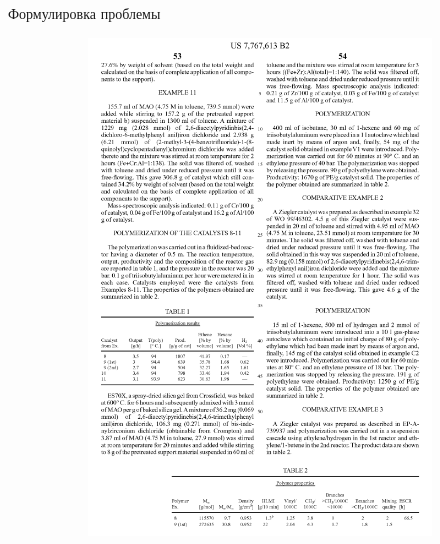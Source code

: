 \documentclass{beamer}
\begin{document}
	\begin{frame}{Формулировка проблемы}

	\begin{figure}[!tbp]
		\begin{subfigure}[b]{0.4\textwidth}
		\includegraphics[width=1\textwidth]{images/patent_data_example.png}
			\caption{}
			\label{fig:patent_data_example}
		\end{subfigure}
		\hfill
		\begin{subfigure}[b]{0.4\textwidth}

\end{subfigure}
\end{figure}
\end{frame}
\end{document}
